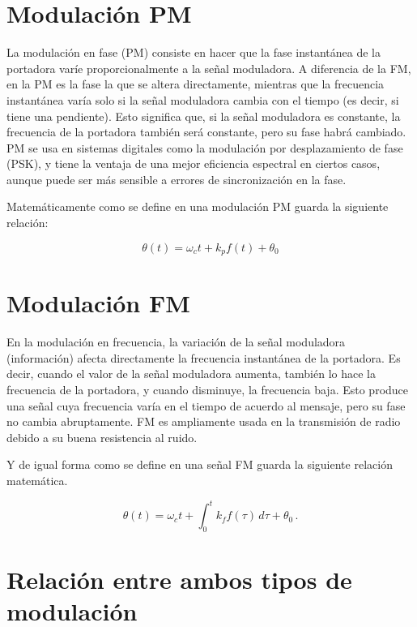 \documentclass[conference]{IEEEtran}
\begin{document}
	\section{ Modulación PM}
	
	La modulación en fase (PM) consiste en hacer que la fase instantánea de la portadora varíe proporcionalmente a la señal moduladora. A diferencia de la FM, en la PM es la fase la que se altera directamente, mientras que la frecuencia instantánea varía solo si la señal moduladora cambia con el tiempo (es decir, si tiene una pendiente). Esto significa que, si la señal moduladora es constante, la frecuencia de la portadora también será constante, pero su fase habrá cambiado. PM se usa en sistemas digitales como la modulación por desplazamiento de fase (PSK), y tiene la ventaja de una mejor eficiencia espectral en ciertos casos, aunque puede ser más sensible a errores de sincronización en la fase.
	
	Matemáticamente como se define en \cite{stremler2006} una modulación PM guarda la siguiente relación:
	
	\begin{equation}
		\theta(t) = \omega_c t + k_p f(t) + \theta_0
	\end{equation}
	
	\section{ Modulación FM}
	
	En la modulación en frecuencia, la variación de la señal moduladora (información) afecta directamente la frecuencia instantánea de la portadora. Es decir, cuando el valor de la señal moduladora aumenta, también lo hace la frecuencia de la portadora, y cuando disminuye, la frecuencia baja. Esto produce una señal cuya frecuencia varía en el tiempo de acuerdo al mensaje, pero su fase no cambia abruptamente. FM es ampliamente usada en la transmisión de radio debido a su buena resistencia al ruido.
	
	Y de igual forma como se define en \cite{stremler2006} una señal FM guarda la siguiente relación matemática.
	
	\begin{equation}
		\theta(t) = \omega_c t + \int_0^t k_f f(\tau)\, d\tau + \theta_0\,.
	\end{equation}
	
	
	\section{Relación entre ambos tipos de modulación}
	
\end{document}
